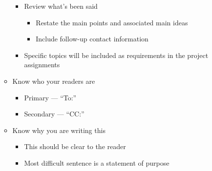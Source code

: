 \begin{itemize}
\begin{itemize}
\begin{itemize}
\begin{itemize}
            \end{itemize}

          \item Review what's been said

            \begin{itemize}

              \item Restate the main points and associated main ideas

              \item Include follow-up contact information

            \end{itemize}

          \item Specific topics will be included as requirements in the project assignments

        \end{itemize}

      \item Know who your readers are

        \begin{itemize}

          \item Primary — ``To:''

          \item Secondary — ``CC:''

        \end{itemize}

      \item Know why you are writing this

        \begin{itemize}

          \item This should be clear to the reader

          \item Most difficult sentence is a statement of purpose

        \end{itemize}

    \end{itemize}

\end{itemize}



